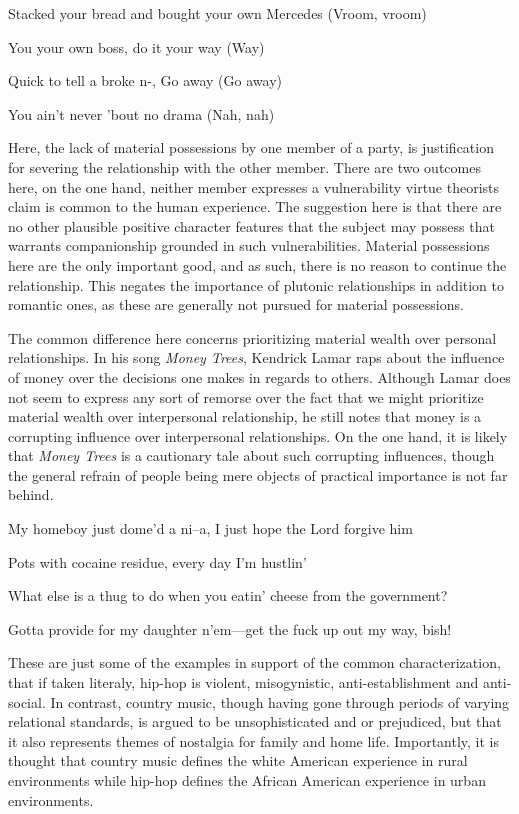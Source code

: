 \documentclass[12pt]{book}
\theoremstyle{definition}
\theoremstyle{remark}
\begin{document}
Stacked your bread and bought your own Mercedes (Vroom, vroom)

You your own boss, do it your way (Way)

Quick to tell a broke n-, Go away (Go away)

You ain't never 'bout no drama (Nah, nah)

Here, the lack of material possessions by one member of a party, is justification for severing the relationship with the other member. There are two outcomes here, on the one hand, neither member expresses a vulnerability virtue theorists claim is common to the human experience. The suggestion here is that there are no other plausible positive character features that the subject may possess that warrants companionship grounded in such vulnerabilities. Material possessions here are the only important good, and as such, there is no reason to continue the relationship. This negates the importance of plutonic relationships in addition to romantic ones, as these are generally not pursued for material possessions.

The common difference here concerns prioritizing material wealth over personal relationships. In his song \emph{Money Trees}, Kendrick Lamar raps about the influence of money over the decisions one makes in regards to others. Although Lamar does not seem to express any sort of remorse over the fact that we might prioritize material wealth over interpersonal relationship, he still notes that money is a corrupting influence over interpersonal relationships. On the one hand, it is likely that \emph{Money Trees} is a cautionary tale about such corrupting influences, though the general refrain of people being mere objects of practical importance is not far behind.

My homeboy just dome'd a ni--a, I just hope the Lord forgive him

Pots with cocaine residue, every day I'm hustlin'

What else is a thug to do when you eatin' cheese from the government?

Gotta provide for my daughter n'em---get the fuck up out my way, bish!

These are just some of the examples in support of the common characterization, that if taken literaly, hip-hop is violent, misogynistic, anti-establishment and anti-social. In contrast, country music, though having gone through periods of varying relational standards, is argued to be unsophisticated and or prejudiced, but that it also represents themes of nostalgia for family and home life. Importantly, it is thought that country music defines the white American experience in rural environments while hip-hop defines the African American experience in urban environments.
\end{document}
